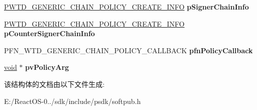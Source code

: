 \begin{DoxyCompactItemize}
\begin{tabbing}
\end{tabbing}\item 
\mbox{\label{struct___w_t_d___g_e_n_e_r_i_c___c_h_a_i_n___p_o_l_i_c_y___d_a_t_a_a323fa8bc1d898902c0120496c8a56b46}} 
\hyperlink{struct___w_t_d___g_e_n_e_r_i_c___c_h_a_i_n___p_o_l_i_c_y___c_r_e_a_t_e___i_n_f_o}{P\+W\+T\+D\+\_\+\+G\+E\+N\+E\+R\+I\+C\+\_\+\+C\+H\+A\+I\+N\+\_\+\+P\+O\+L\+I\+C\+Y\+\_\+\+C\+R\+E\+A\+T\+E\+\_\+\+I\+N\+FO} {\bfseries p\+Signer\+Chain\+Info}
\item 
\mbox{\label{struct___w_t_d___g_e_n_e_r_i_c___c_h_a_i_n___p_o_l_i_c_y___d_a_t_a_a2a70e4d42b73b27124b30a09df154ec3}} 
\hyperlink{struct___w_t_d___g_e_n_e_r_i_c___c_h_a_i_n___p_o_l_i_c_y___c_r_e_a_t_e___i_n_f_o}{P\+W\+T\+D\+\_\+\+G\+E\+N\+E\+R\+I\+C\+\_\+\+C\+H\+A\+I\+N\+\_\+\+P\+O\+L\+I\+C\+Y\+\_\+\+C\+R\+E\+A\+T\+E\+\_\+\+I\+N\+FO} {\bfseries p\+Counter\+Signer\+Chain\+Info}
\item 
\mbox{\label{struct___w_t_d___g_e_n_e_r_i_c___c_h_a_i_n___p_o_l_i_c_y___d_a_t_a_a09bc7f5913a47d23a04fad9b0d6b369c}} 
P\+F\+N\+\_\+\+W\+T\+D\+\_\+\+G\+E\+N\+E\+R\+I\+C\+\_\+\+C\+H\+A\+I\+N\+\_\+\+P\+O\+L\+I\+C\+Y\+\_\+\+C\+A\+L\+L\+B\+A\+CK {\bfseries pfn\+Policy\+Callback}
\item 
\mbox{\label{struct___w_t_d___g_e_n_e_r_i_c___c_h_a_i_n___p_o_l_i_c_y___d_a_t_a_a404489963e4fd8d38a51fe9243418ad4}} 
\hyperlink{interfacevoid}{void} $\ast$ {\bfseries pv\+Policy\+Arg}
\end{DoxyCompactItemize}


该结构体的文档由以下文件生成\+:\begin{DoxyCompactItemize}
\item 
E\+:/\+React\+O\+S-\/0../sdk/include/psdk/softpub.\+h\end{DoxyCompactItemize}
